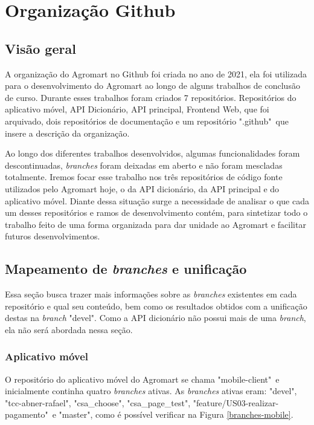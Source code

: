\chapter[Organização Github]{Organização Github}

\section{Visão geral}
A organização do Agromart no Github foi criada no ano de 2021, ela foi utilizada para o desenvolvimento do Agromart ao longo de alguns trabalhos de conclusão de curso. Durante esses trabalhos foram criados 7 repositórios. Repositórios do aplicativo móvel, API Dicionário, API principal, Frontend Web, que foi arquivado, dois repositórios de documentação e um repositório ".github"\ que insere a descrição da organização. 

Ao longo dos diferentes trabalhos desenvolvidos, algumas funcionalidades foram descontinuadas, \textit{branches} foram deixadas em aberto e não foram mescladas totalmente. Iremos focar esse trabalho nos três repositórios de código fonte utilizados pelo Agromart hoje, o da API dicionário, da API principal e do aplicativo móvel. Diante dessa situação surge a necessidade de analisar o que cada um desses repositórios e ramos de desenvolvimento contém, para sintetizar todo o trabalho feito de uma forma organizada para dar unidade ao Agromart e facilitar futuros desenvolvimentos.

\section{Mapeamento de \textit{branches} e unificação}
Essa seção busca trazer mais informações sobre as \textit{branches} existentes em cada repositório e qual seu conteúdo, bem como os resultados obtidos com a unificação destas na \textit{branch} "devel". Como a API dicionário não possui mais de uma \textit{branch}, ela não será abordada nessa seção.

\subsection{Aplicativo móvel}
O repositório do aplicativo móvel do Agromart se chama "mobile-client"\ e inicialmente continha quatro \textit{branches} ativas. As \textit{branches} ativas eram: "devel", "tcc-abner-rafael", "csa\_choose", "csa\_page\_test", "feature/US03-realizar-pagamento"\ e "master", como é possível verificar na Figura \ref{branches-mobile}.

